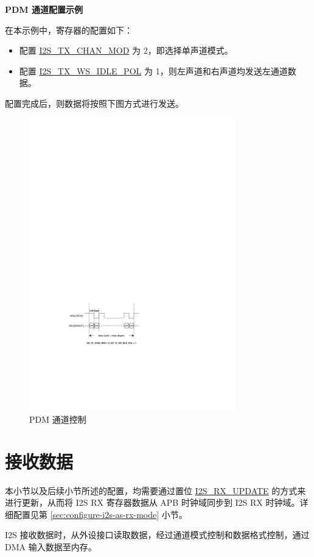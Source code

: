 \documentclass[main\_\_CN.tex]{subfiles}
\begin{document}
\textbf{PDM 通道配置示例}

在本示例中，寄存器的配置如下：
\begin{itemize}
    \item 配置 \hyperref[fielddesc:I2STXCHANMOD]{I2S\_TX\_CHAN\_MOD} 为 2，即选择单声道模式。
    \item 配置 \hyperref[fielddesc:I2STXWSIDLEPOL]{I2S\_TX\_WS\_IDLE\_POL} 为 1，则左声道和右声道均发送左通道数据。
\end{itemize}

配置完成后，则数据将按照下图方式进行发送。

\begin{figure}[H]
    \centering
    \includegraphics[width=0.8\textwidth]{03-I2S/figures/i2s_chan_mode_20220210.pdf}
    \caption{PDM 通道控制}
    \label{Figure:i2s_channel_mode}
\end{figure}

\section{接收数据}\label{RXCHAN}
\begin{tiplisting}
本小节以及后续小节所述的配置，均需要通过置位 \hyperref[fielddesc:I2SRXUPDATE]{I2S\_RX\_UPDATE} 的方式来进行更新，从而将 I2S RX 寄存器数据从 APB 时钟域同步到 I2S RX 时钟域。详细配置见第 \ref{sec:configure-i2s-as-rx-mode} 小节。
\end{tiplisting}
\vspace{-2em}
I2S 接收数据时，从外设接口读取数据，经过通道模式控制和数据格式控制，通过 DMA 输入数据至内存。
\end{document}
